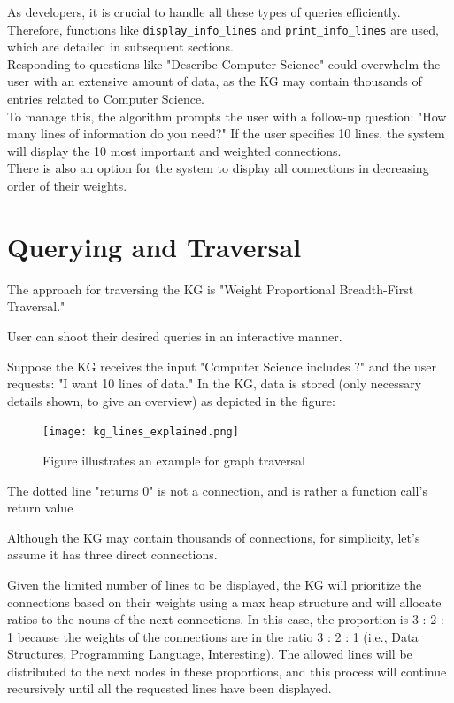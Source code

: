 \documentclass[conference]{IEEEtran}
\begin{document}
As developers, it is crucial to handle all these types of queries efficiently. Therefore, functions like \texttt{display\_info\_lines} and \texttt{print\_info\_lines} are used, which are detailed in subsequent sections.
\\

Responding to questions like "Describe Computer Science" could overwhelm the user with an extensive amount of data, as the KG may contain thousands of entries related to Computer Science. \\
To manage this, the algorithm prompts the user with a follow-up question: "How many lines of information do you need?" If the user specifies 10 lines, the system will display the 10 most important and weighted connections. 
\\
There is also an option for the system to display all connections in decreasing order of their weights.


\section{Querying and Traversal}


The approach for traversing the KG is "Weight Proportional Breadth-First 
Traversal."

User can shoot their desired queries in an interactive manner. 

Suppose the KG receives the input "Computer Science includes ?" and the user requests: "I want 10 lines of data."
In the KG, data is stored (only necessary details shown, to give an overview) as depicted in the figure:

\begin{figure}[htbp]
\centering
\texttt{[image: kg\_lines\_explained.png]} %
\caption{Figure illustrates an example for graph traversal}
\label{fig}
\end{figure}

The dotted line "returns 0" is not a connection, and is rather a function call's return value

Although the KG may contain thousands of connections, for simplicity, let's assume it has three direct connections.

Given the limited number of lines to be displayed, the KG will prioritize the connections based on their weights using a max heap structure and will allocate ratios to the nouns of the next connections. In this case, the proportion is 3 : 2 : 1 
because the weights of the connections are in the ratio 3 : 2 : 1 (i.e., Data Structures, Programming Language, Interesting). The allowed lines will be distributed to the next nodes in these proportions, and this process will continue recursively until all the requested lines have been displayed.\\
\end{document}
